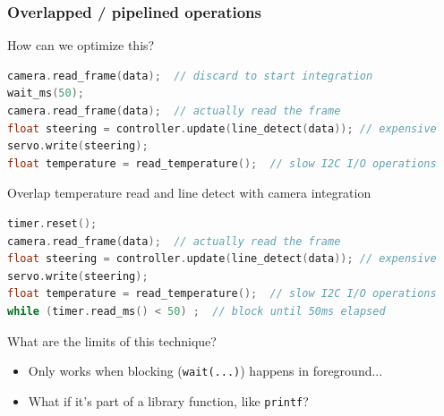 \documentclass{beamer}
\begin{document}
\begin{frame}[fragile]
\frametitle{Overlapped / pipelined operations}
How can we optimize this?
\begin{lstlisting}[language=C++,basicstyle=\ttfamily\scriptsize]
camera.read_frame(data);  // discard to start integration
wait_ms(50);
camera.read_frame(data);  // actually read the frame
float steering = controller.update(line_detect(data)); // expensive
servo.write(steering);
float temperature = read_temperature();  // slow I2C I/O operations
\end{lstlisting}
\hfill \break
Overlap temperature read and line detect with camera integration
\begin{lstlisting}[language=C++,basicstyle=\ttfamily\scriptsize]
timer.reset();
camera.read_frame(data);  // actually read the frame
float steering = controller.update(line_detect(data)); // expensive
servo.write(steering);
float temperature = read_temperature();  // slow I2C I/O operations
while (timer.read_ms() < 50) ;  // block until 50ms elapsed
\end{lstlisting}

What are the limits of this technique?
 {\begin{itemize}
  \item Only works when blocking (\texttt{wait(...)}) happens in foreground... \\
  \item What if it's part of a library function, like \texttt{printf}?
\end{itemize}}
\end{frame}
\end{document}
